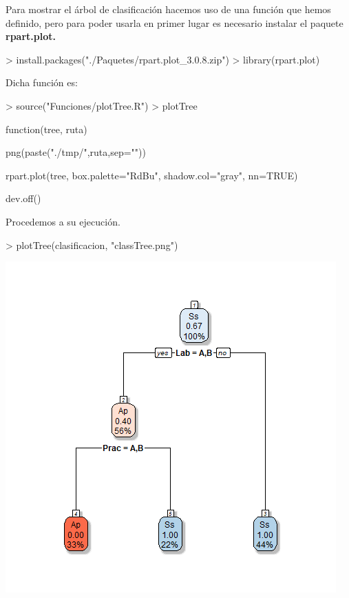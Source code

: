 \documentclass [a4paper] {article}
\begin{document}
\bigskip
Para mostrar el árbol de clasificación hacemos uso de una función que hemos definido, pero para poder usarla 
en primer lugar es necesario instalar el paquete \textbf{rpart.plot.}
\begin{Schunk}
\begin{Sinput}
> install.packages("./Paquetes/rpart.plot_3.0.8.zip")
> library(rpart.plot)
\end{Sinput}
\end{Schunk}

Dicha función es:
\begin{Schunk}
\begin{Sinput}
> source("Funciones/plotTree.R")
> plotTree
\end{Sinput}
\begin{Soutput}
function(tree, ruta) {

    png(paste("./tmp/",ruta,sep=""))

    rpart.plot(tree, box.palette="RdBu", shadow.col="gray", nn=TRUE)

    dev.off()
}
\end{Soutput}
\end{Schunk}

\bigskip
Procedemos a su ejecución.
\begin{Schunk}
\begin{Sinput}
> plotTree(clasificacion, "classTree.png")
\end{Sinput}
\end{Schunk}
\includegraphics[width=\textwidth]{classTree}
\end{document}
